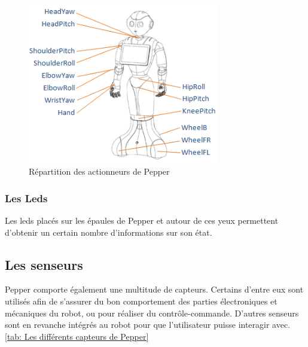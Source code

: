\begin{figure}[h]
	\centering\includegraphics[height=7cm]{images/pepper_motors.png}
	\caption{Répartition des actionneurs de Pepper}
	\label{fig:Répartition des actionneurs de Pepper}
\end{figure}

\subsubsection{Les Leds}
\label{Introduction:Présentation du produit:Les actionneurs: Les leds}
Les leds placés sur les épaules de Pepper et autour de ces yeux permettent d'obtenir un certain nombre d'informations sur son état.

\subsection{Les senseurs}
\label{Introduction:Présentation du produit:Les senseurs}
Pepper comporte également une multitude de capteurs. Certains d'entre eux sont utilisés afin de s'assurer du bon comportement des parties électroniques et mécaniques du robot, ou pour réaliser du contrôle-commande. D'autres senseurs sont en revanche intégrés au robot pour que l'utilisateur puisse interagir avec. \ref{tab: Les différents capteurs de Pepper}

